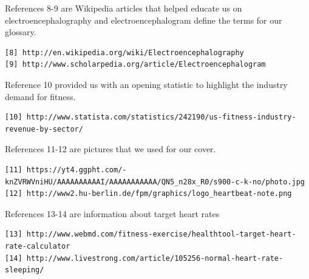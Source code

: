 \documentclass[letterpaper,english, 12pt]{scrreprt}
\begin{document}
References 8-9 are Wikipedia articles that helped educate us on electroencephalography and electroencephalogram define the terms for our glossary.
\begin{verbatim}
[8] http://en.wikipedia.org/wiki/Electroencephalography
[9] http://www.scholarpedia.org/article/Electroencephalogram
\end{verbatim}

Reference 10 provided us with an opening statistic to highlight the industry demand for fitness.
\begin{verbatim}
[10] http://www.statista.com/statistics/242190/us-fitness-industry-revenue-by-sector/
\end{verbatim}

References 11-12 are pictures that we used for our cover.
\begin{verbatim}
[11] https://yt4.ggpht.com/-knZVRWVniHU/AAAAAAAAAAI/AAAAAAAAAAA/QN5_n28x_R0/s900-c-k-no/photo.jpg
[12] http://www2.hu-berlin.de/fpm/graphics/logo_heartbeat-note.png
\end{verbatim}


References 13-14 are information about target heart rates
\begin{verbatim}
[13] http://www.webmd.com/fitness-exercise/healthtool-target-heart-rate-calculator
[14] http://www.livestrong.com/article/105256-normal-heart-rate-sleeping/
\end{verbatim}
\end{document}
